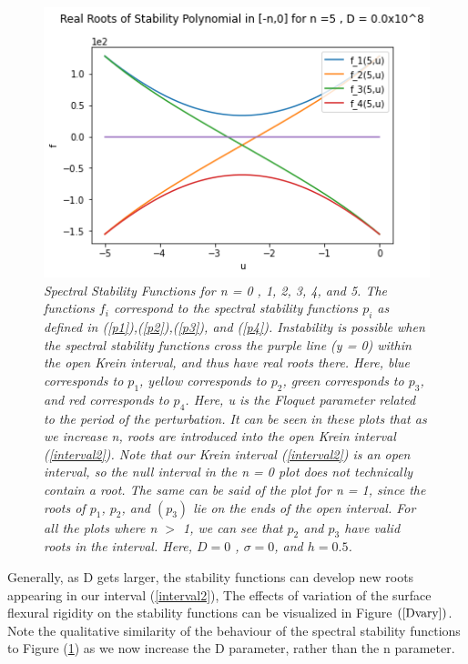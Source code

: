 \documentclass{article}
\begin{document}
\begin{figure}[hbt!]
\includegraphics[width=.47\textwidth]{n5.png}\hfill
\caption{\emph{Spectral Stability Functions for n = 0 , 1, 2, 3, 4, and 5. The functions \(f_i\) correspond to the spectral stability functions \(p_i\) as defined in (\ref{p1}),(\ref{p2}),(\ref{p3}), and (\ref{p4}). Instability is possible when the spectral stability functions cross the purple line (y = 0) within the open Krein interval, and thus have real roots there. Here, blue corresponds to \(p_1\), yellow corresponds to \(p_2\), green corresponds to \(p_3\), and red corresponds to \(p_4\). Here, u is the Floquet parameter related to the period of the perturbation. It can be seen in these plots that as we increase n, roots are introduced into the open Krein interval (\ref{interval2}). Note that our Krein interval (\ref{interval2}) is an open interval, so the null interval in the n = 0 plot does not technically contain a root. The same can be said of the plot for n = 1, since the roots of \(p_1\), \(p_2\), and \((p_3)\) lie on the ends of the open interval. For all the plots where n \(>\) 1, we can see that \(p_2\) and \(p_3\) have valid roots in the interval.  Here, \(D = 0\) , \(\sigma = 0\), and \(h = 0.5\).}} \label{nvary}
\end{figure}



Generally, as D gets larger, the stability functions can develop new roots appearing in our interval (\ref{interval2}), The effects of variation of the surface flexural rigidity on the stability functions can be visualized in Figure \((\ref{Dvary})\). Note the qualitative similarity of the behaviour of the spectral stability functions to Figure (\ref{nvary}) as we now increase the D parameter, rather than the n parameter. \\
\end{document}
